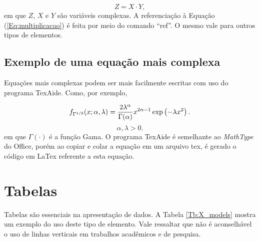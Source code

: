 \begin{equation}\label{Eq:multiplicacao}
%
Z = X \cdot Y,
%
\end{equation}
%
em que $Z$, $X$ e $Y$ são variáveis complexas. A referenciação à Equação (\ref{Eq:multiplicacao}) é feita por meio do comando ``ref''. O mesmo vale para outros tipos de elementos.

\subsection{Exemplo de uma equação mais complexa}

  Equações mais complexas podem ser mais facilmente escritas com uso do programa TexAide. Como, por exemplo,

    \begin{equation}\label{Eq:sqrt_gamma_X}
    f_{\Gamma ^{{1 \mathord{\left/
    {\vphantom {1 2}} \right.
    \kern-\nulldelimiterspace} 2}} } (x;\alpha ,\lambda ) = \frac{{2\lambda ^\alpha  }}{{\Gamma (\alpha )}}x^{2\alpha  - 1} \exp \left( { - \lambda x^2 } \right).
    \end{equation}
    \[
    \alpha ,\lambda > 0.
    \]
    em que $\Gamma(\cdot)$ é a função Gama. O programa TexAide é semelhante ao \textit{MathType} do Office, porém ao copiar e colar a equação em um arquivo tex, é gerado o código em LaTex referente a esta equação.

\section{Tabelas}

Tabelas são essenciais na apresentação de dados. A Tabela \ref{Tb:X_models} mostra um exemplo do uso deste tipo de elemento. Vale ressaltar que não é aconselhável o uso de linhas verticais em trabalhos acadêmicos e de pesquisa.

